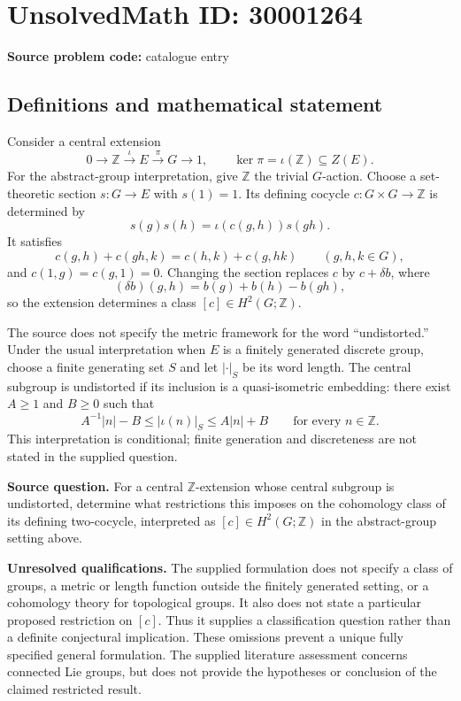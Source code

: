 \documentclass[11pt]{article}
\newcommand{\Z}{\mathbb{Z}}
\begin{document}
\section*{UnsolvedMath ID: 30001264}
\textbf{Source problem code:} catalogue entry
\subsection{Definitions and mathematical statement}
Consider a central extension
\[
0\longrightarrow\Z\xrightarrow{\iota}E\xrightarrow{\pi}G\longrightarrow1,
\qquad \ker\pi=\iota(\Z)\subseteq Z(E).
\]
For the abstract-group interpretation, give \(\Z\) the trivial \(G\)-action. Choose a set-theoretic section \(s:G\to E\) with \(s(1)=1\). Its defining cocycle \(c:G\times G\to\Z\) is determined by
\[
s(g)s(h)=\iota(c(g,h))s(gh).
\]
It satisfies
\[
c(g,h)+c(gh,k)=c(h,k)+c(g,hk)
\qquad(g,h,k\in G),
\]
and \(c(1,g)=c(g,1)=0\). Changing the section replaces \(c\) by \(c+\delta b\), where
\[
(\delta b)(g,h)=b(g)+b(h)-b(gh),
\]
so the extension determines a class \([c]\in H^2(G;\Z)\).

The source does not specify the metric framework for the word ``undistorted.'' Under the usual interpretation when \(E\) is a finitely generated discrete group, choose a finite generating set \(S\) and let \(|\cdot|_S\) be its word length. The central subgroup is undistorted if its inclusion is a quasi-isometric embedding: there exist \(A\geq1\) and \(B\geq0\) such that
\[
A^{-1}|n|-B\leq |\iota(n)|_S\leq A|n|+B
\qquad\text{for every }n\in\Z.
\]
This interpretation is conditional; finite generation and discreteness are not stated in the supplied question.

\textbf{Source question.} For a central \(\Z\)-extension whose central subgroup is undistorted, determine what restrictions this imposes on the cohomology class of its defining two-cocycle, interpreted as \([c]\in H^2(G;\Z)\) in the abstract-group setting above.

\textbf{Unresolved qualifications.} The supplied formulation does not specify a class of groups, a metric or length function outside the finitely generated setting, or a cohomology theory for topological groups. It also does not state a particular proposed restriction on \([c]\). Thus it supplies a classification question rather than a definite conjectural implication. These omissions prevent a unique fully specified general formulation. The supplied literature assessment concerns connected Lie groups, but does not provide the hypotheses or conclusion of the claimed restricted result.
\end{document}
